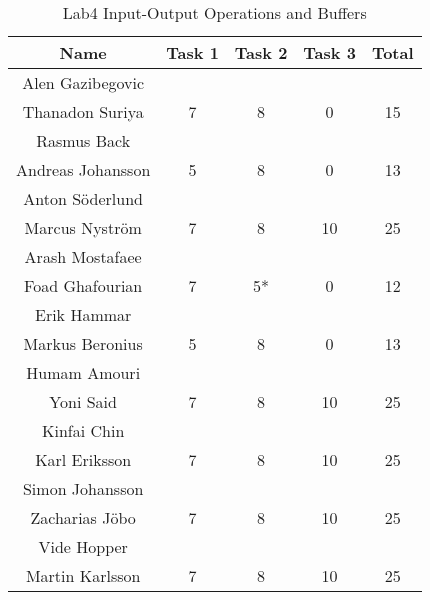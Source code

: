 \documentclass{article}
\begin{document}
\begin{table}[ht]
\caption{Lab4 Input-Output Operations and Buffers}
\centering
\begin{tabular}{c c c c c} 
\hline\hline 
Name & Task 1 & Task 2 & Task 3 & Total \\ [0.5ex] 
\hline
Alen Gazibegovic \\ Thanadon Suriya 
& 7 & 8 & 0 & 15 \\
\hline
Rasmus Back \\ Andreas Johansson 
& 5 & 8 & 0 & 13 \\
\hline 
Anton Söderlund \\ Marcus Nyström
& 7 & 8 & 10 & 25 \\
\hline
Arash Mostafaee \\ Foad Ghafourian
& 7 & 5* & 0 & 12 \\
\hline
Erik Hammar \\ Markus Beronius
& 5 & 8 & 0 & 13 \\
\hline 
Humam Amouri \\ Yoni Said
& 7 & 8 & 10 & 25 \\ 
\hline
Kinfai Chin \\ Karl Eriksson
& 7 & 8 & 10 & 25 \\ 
\hline
Simon Johansson \\ Zacharias Jöbo
& 7 & 8 & 10 & 25 \\
\hline
Vide Hopper \\ Martin Karlsson
& 7 & 8 & 10 & 25 \\ [1ex]
\hline
\end{tabular}
\label{table:nonlin}
\end{table}

\end{document}
